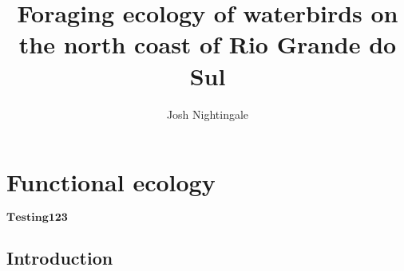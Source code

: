 \documentclass[12pt,a4paper]{book}
\author{Josh Nightingale}
\title{Foraging ecology of waterbirds on the north coast of Rio Grande do Sul}
\begin{document}
\maketitle

\tableofcontents

\chapter{Functional ecology}

$\mathbf{Testing123}$

\section{Introduction}
%
%
%
%
%
%
%
%
%
%
\end{document}
